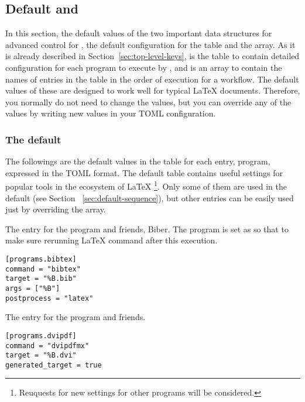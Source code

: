 \documentclass{llmk-doc}
\begin{document}
\subsection{Default  and }

In this section, the default values of the two important data structures for
advanced control for , \ie the default configuration for the
 table and the  array. As it is already described
in Section~\ref{sec:top-level-keys},  is the table to contain
detailed configuration for each program to execute by , and
 is an array to contain the names of entries in the
 table in the order of execution for a workflow. The default
values of these are designed to work well for typical {\LaTeX} documents.
Therefore, you normally do not need to change the values, but you can override
any of the values by writing new values in your TOML configuration.

\subsubsection{The default }
\label{sec:default-programs}

The followings are the default values in the  table for each
entry, \ie program, expressed in the TOML format. The default 
table contains useful settings for popular tools in the ecosystem of {\LaTeX}%
\footnote{Reuquests for new settings for other programs will be considered.}.
Only some of them are used in the default  (see Section~%
\ref{sec:default-sequence}), but other entries can be easily used just by
overriding the  array.

 The entry for the {\BibTeX} program and friends, \eg Biber.
The  program is set as  so that to make sure
rerunning {\LaTeX} command after this execution.
%
\begin{lstlisting}[style=toml]
[programs.bibtex]
command = "bibtex"
target = "%B.bib"
args = ["%B"]
postprocess = "latex"
\end{lstlisting}

 The entry for the  program and friends.
%
\begin{lstlisting}[style=toml]
[programs.dvipdf]
command = "dvipdfmx"
target = "%B.dvi"
generated_target = true
\end{lstlisting}
\end{document}
